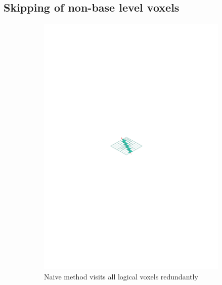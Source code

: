 \subsection{Skipping of non-base level voxels}
%
%
\begin{figure}[ht]
\centering
\begin{subfigure}{.33\textwidth}
  \centering
  \includegraphics[scale=1]{figures/emptyspace_naive.pdf}
  \caption{Naive method visits all \newline logical voxels redundantly}
  \label{fig:emptyspace1}
\end{subfigure}%
\begin{subfigure}{.33\textwidth}
  \centering

\end{subfigure}
\end{figure}
